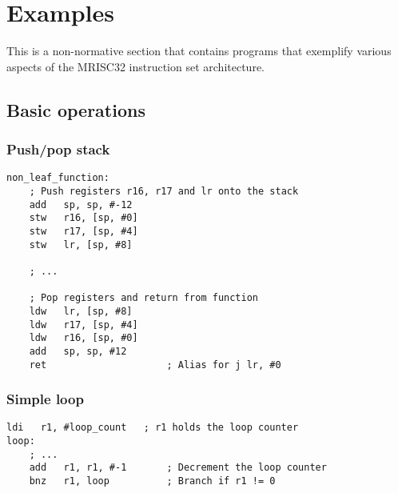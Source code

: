 %

\onecolumn

\chapter{Examples}

This is a non-normative section that contains programs that exemplify various
aspects of the MRISC32 instruction set architecture.

\section{Basic operations}

\subsection{Push/pop stack}

\begin{lstlisting}[style=assembler]
non_leaf_function:
    ; Push registers r16, r17 and lr onto the stack
    add   sp, sp, #-12
    stw   r16, [sp, #0]
    stw   r17, [sp, #4]
    stw   lr, [sp, #8]

    ; ...

    ; Pop registers and return from function
    ldw   lr, [sp, #8]
    ldw   r17, [sp, #4]
    ldw   r16, [sp, #0]
    add   sp, sp, #12
    ret                     ; Alias for j lr, #0
\end{lstlisting}

\subsection{Simple loop}

\begin{lstlisting}[style=assembler]
    ldi   r1, #loop_count   ; r1 holds the loop counter
loop:
    ; ...
    add   r1, r1, #-1       ; Decrement the loop counter
    bnz   r1, loop          ; Branch if r1 != 0
\end{lstlisting}

